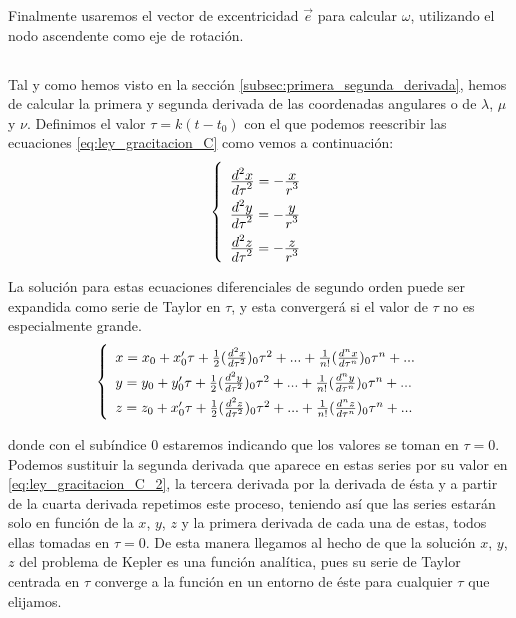 \documentclass[11pt]{article}
\newcommand\ddfrac[2]{\frac{\displaystyle #1}{\displaystyle #2}}
\begin{document}
Finalmente usaremos el vector de excentricidad $\vec{e}$ para calcular $\omega$, utilizando el nodo ascendente como eje de rotación.\\

\subsection{}
\label{subsec:series_potencias}
Tal y como hemos visto en la sección \ref{subsec:primera_segunda_derivada}, hemos de calcular la primera y segunda derivada de las coordenadas angulares o de $\lambda$, $\mu$ y $\nu$. Definimos el valor $\tau=k(t-t_0)$ con el que podemos reescribir las ecuaciones \eqref{eq:ley_gracitacion_C} como vemos a continuación:
\begin{align}
\left\{
\def\arraystretch{2}
\begin{array}{l}
	\ddfrac{d^2x}{d\tau^2}=-\ddfrac{x}{r^3}\\
	\ddfrac{d^2y}{d\tau^2}=-\ddfrac{y}{r^3}\\
	\ddfrac{d^2z}{d\tau^2}=-\ddfrac{z}{r^3}
\end{array}
\right.
\label{eq:ley_gravitacion_C_2}
\end{align}

La solución para estas ecuaciones diferenciales de segundo orden puede ser expandida como serie de Taylor en $\tau$, y esta convergerá si el valor de $\tau$ no es especialmente grande.
\begin{align}
\left\{
\def\arraystretch{1.5}
\begin{array}{l}
	x=x_0+x_0'\tau+\frac{1}{2}(\frac{d^2x}{d\tau^2})_0\tau^2+...+\frac{1}{n!}(\frac{d^nx}{d\tau^n})_0\tau^n+...\\
	y=y_0+y_0'\tau+\frac{1}{2}(\frac{d^2y}{d\tau^2})_0\tau^2+...+\frac{1}{n!}(\frac{d^ny}{d\tau^n})_0\tau^n+...\\
	z=z_0+x_0'\tau+\frac{1}{2}(\frac{d^2z}{d\tau^2})_0\tau^2+...+\frac{1}{n!}(\frac{d^nz}{d\tau^n})_0\tau^n+...\\	
\end{array}
\right.
\label{eq:series_taylor}
\end{align}

\noindent donde con el subíndice 0 estaremos indicando que los valores se toman en $\tau=0$. Podemos sustituir la segunda derivada que aparece en estas series por su valor en \eqref{eq:ley_gracitacion_C_2}, la tercera derivada por la derivada de ésta y a partir de la cuarta derivada repetimos este proceso, teniendo así que las series estarán solo en función de la $x$, $y$, $z$ y la primera derivada de cada una de estas, todos ellas tomadas en $\tau=0$.  De esta manera llegamos al hecho de que la solución $x$, $y$, $z$ del problema de Kepler es una función analítica, pues su serie de Taylor centrada en $\tau$ converge a la función en un entorno de éste para cualquier $\tau$ que elijamos.\\
\end{document}
